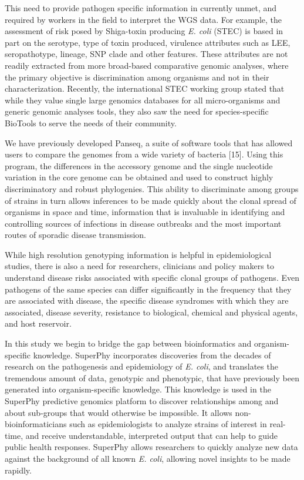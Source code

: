\documentclass{bmcart}
\begin{document}
This need to provide pathogen specific information in currently unmet, and required by workers in the field to interpret the WGS data. For example, the assessment of risk posed by Shiga-toxin producing \textit{E. coli} (STEC) is based in part on the serotype, type of toxin produced, virulence attributes such as LEE, seropathotype, lineage, SNP clade and other features. These attributes are not readily extracted from more broad-based comparative genomic analyses, where the primary objective is discrimination among organisms and not in their characterization. Recently, the international STEC working group stated that while they value single large genomics databases for all micro-organisms and generic genomic analyses tools, they also saw the need for species-specific BioTools to serve the needs of their community.

We have previously developed Panseq, a suite of software tools that has allowed users to compare the genomes from a wide variety of bacteria [15]. Using this program, the differences in the accessory genome and the single nucleotide variation in the core genome can be obtained and used to construct highly discriminatory and robust phylogenies. This ability to discriminate among groups of strains in turn allows inferences to be made quickly about the clonal spread of organisms in space and time, information that is invaluable in identifying and controlling sources of infections in disease outbreaks and the most important routes of sporadic disease transmission. 

While high resolution genotyping information is helpful in epidemiological studies, there is also a need for researchers, clinicians and policy makers to understand disease risks associated with specific clonal groups of pathogens. Even pathogens of the same species can differ significantly in the frequency that they are associated with disease, the specific disease syndromes with which they are associated, disease severity, resistance to biological, chemical and physical agents, and host reservoir.

In this study we begin to bridge the gap between bioinformatics and organism-specific knowledge. SuperPhy incorporates discoveries from the decades of research on the pathogenesis and epidemiology of \textit{E. coli}, and translates the tremendous amount of data, genotypic and phenotypic, that have previously been generated into organism-specific knowledge. This knowledge is used in the SuperPhy predictive genomics platform to discover relationships among and about sub-groups that would otherwise be impossible. It allows non-bioinformaticians such as epidemiologists to analyze strains of interest in real-time, and receive understandable, interpreted output that can help to guide public health responses. SuperPhy allows researchers to quickly analyze new data against the background of all known \textit{E. coli}, allowing novel insights to be made rapidly.
\end{document}
